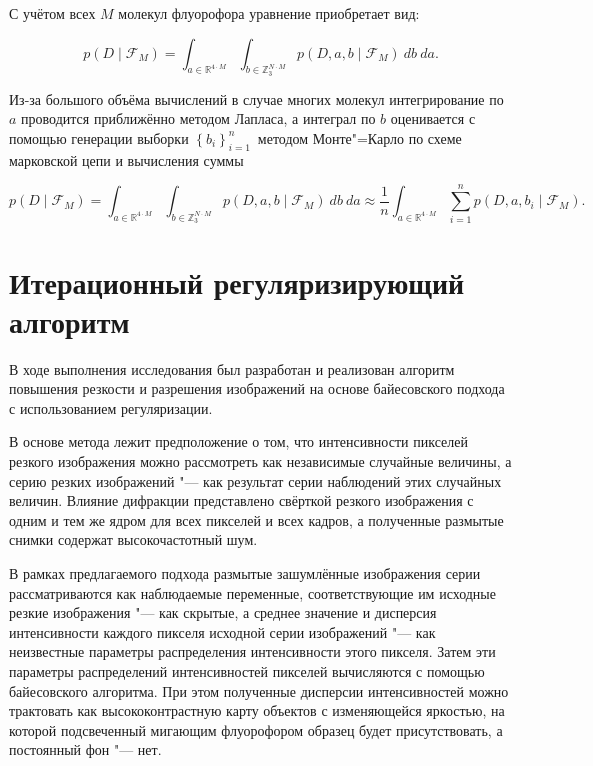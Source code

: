 С учётом всех $M$ молекул флуорофора уравнение приобретает вид:

\begin{equation*}
	p\left(D\middle|\mathcal{F}_M\right)=\int_{a\in\mathbb{R}^{4 \cdot M}}\int_{b\in\mathbb{Z}_3^{N \cdot M}}{p\left(D,a,b\middle|\mathcal{F}_M\right)\ db\ da}.
\end{equation*}	

Из-за большого объёма вычислений в случае многих молекул интегрирование по $a$ проводится приближённо методом Лапласа, а интеграл по $b$ оценивается с помощью генерации выборки $\left\{b_i\right\}_{i=1\ }^n$ методом Монте"=Карло по схеме марковской цепи и вычисления суммы

\begin{equation*}
	p\left(D\middle|\mathcal{F}_M\right)=\int_{a\in\mathbb{R}^{4 \cdot M}}\int_{b\in\mathbb{Z}_3^{N \cdot M}}{p\left(D,a,b\middle|\mathcal{F}_M\right)\ db\ da} \approx \frac{1}{n}\int_{a\in\mathbb{R}^{4 \cdot M}}{\sum_{i=1}^{n}{p\left(D,a,b_i\middle|\mathcal{F}_M\right)}}.
\end{equation*}

\section{Итерационный регуляризирующий алгоритм}

В ходе выполнения исследования был разработан и реализован алгоритм повышения резкости и разрешения изображений на основе байесовского подхода с использованием регуляризации.

В основе метода лежит предположение о том, что интенсивности пикселей резкого изображения можно рассмотреть как независимые случайные величины, а серию резких изображений "--- как результат серии наблюдений этих случайных величин. Влияние дифракции представлено свёрткой резкого изображения с одним и тем же ядром для всех пикселей и всех кадров, а полученные размытые снимки содержат высокочастотный шум.

В рамках предлагаемого подхода размытые зашумлённые изображения серии рассматриваются как наблюдаемые переменные, соответствующие им исходные резкие изображения "--- как скрытые, а среднее значение и дисперсия интенсивности каждого пикселя исходной серии изображений "--- как неизвестные параметры распределения интенсивности этого пикселя. Затем эти параметры распределений интенсивностей пикселей вычисляются с помощью байесовского алгоритма. При этом полученные дисперсии интенсивностей можно трактовать как высококонтрастную карту объектов с изменяющейся яркостью, на которой подсвеченный мигающим флуорофором образец будет присутствовать, а постоянный фон "--- нет.

